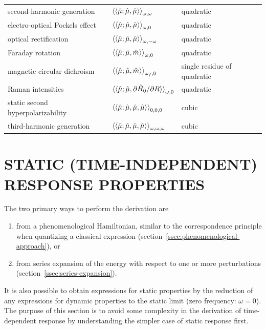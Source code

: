 \documentclass[%
class = book,%
crop = false,%
float = true,%
multi = true,%
preview = false,%
]{standalone}
\newcommand{\caps}[1]{\uppercase{#1}}
\begin{document}
\begin{table}
\begin{tabular}{lll}
    second-harmonic generation        & \( \braket{\braket{\hat{\mu};\hat{\mu},\hat{\mu}}}_{\omega,\omega} \)                  & quadratic \\
    electro-optical Pockels effect    & \( \braket{\braket{\hat{\mu};\hat{\mu},\hat{\mu}}}_{\omega,0} \)                       & quadratic \\
    optical rectification             & \( \braket{\braket{\hat{\mu};\hat{\mu},\hat{\mu}}}_{\omega,-\omega} \)                 & quadratic \\
    Faraday rotation                  & \( \braket{\braket{\hat{\mu};\hat{\mu},\hat{m}}}_{\omega,0} \)                         & quadratic \\
    magnetic circular dichroism       & \( \braket{\braket{\hat{\mu};\hat{\mu},\hat{m}}}_{\omega_{f},0} \)                     & single residue of quadratic \\
    Raman intensities                 & \( \braket{\braket{\hat{\mu};\hat{\mu},\partial\hat{H}_{0}/\partial R}}_{\omega,0} \)  & quadratic \\
    \midrule
    static second hyperpolarizability & \( \braket{\braket{\hat{\mu};\hat{\mu},\hat{\mu},\hat{\mu}}}_{0,0,0} \)                & cubic \\
    third-harmonic generation         & \( \braket{\braket{\hat{\mu};\hat{\mu},\hat{\mu},\hat{\mu}}}_{\omega,\omega,\omega} \) & cubic \\
    \bottomrule
  \end{tabular}
\end{table}

\section{\texorpdfstring{\caps{Static (time-independent) response properties}}{Static (time-independent) response properties}}
\label{sec:static-properties}

The two primary ways to perform the derivation are
\begin{enumerate}
\item from a phenomenological Hamiltonian, similar to the correspondence principle when quantizing a classical expression (section~\ref{ssec:phenomenological-approach}), or
\item from series expansion of the energy with respect to one or more perturbations (section~\ref{ssec:series-expansion}).
\end{enumerate}
It is also possible to obtain expressions for static properties by the reduction of any expressions for dynamic properties to the static limit (zero frequency: \(\omega = 0\)). The purpose of this section is to avoid some complexity in the derivation of time-dependent response by understanding the simpler case of static response first.
\end{document}
